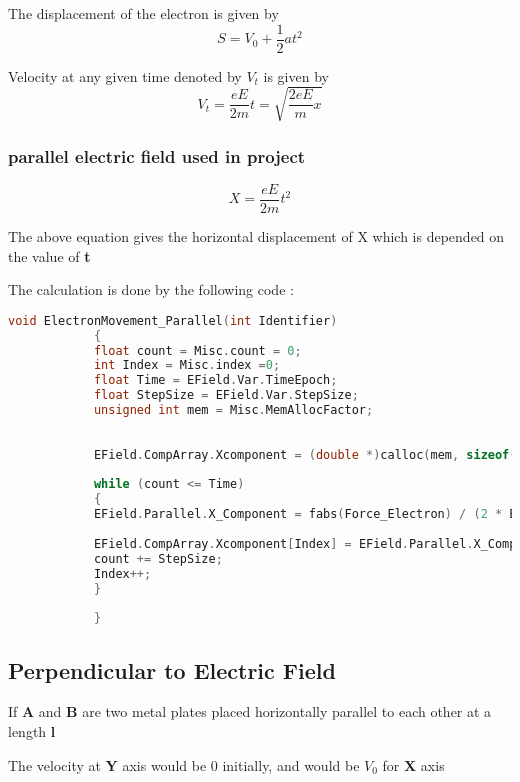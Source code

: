 \documentclass[a4paper,20pt,twoside]{report}
\begin{document}
			The displacement of the electron is given by 
			\begin{equation}
			S = V_0 + \frac{1}{2}at^2
			\end{equation}
			
			Velocity at any given time denoted by \textbf{$V_t$} is given by
			\begin{equation}
			V_t = \frac{eE}{2m}t = \sqrt{\frac{2eE}{m} x}
			\end{equation}
			
			\subsubsection{parallel electric field used in project}
			
			\begin{equation}
			X = \frac{eE}{2m}t^2
			\end{equation}
			
			The above equation gives the horizontal displacement of X which is depended
			on the value of \textbf{t}
			
			The calculation is done by the following code :
			\vspace{10mm}
			\begin{lstlisting}[language = C]
		void ElectronMovement_Parallel(int Identifier)
			{
			float count = Misc.count = 0;
			int Index = Misc.index =0;
			float Time = EField.Var.TimeEpoch;
			float StepSize = EField.Var.StepSize;
			unsigned int mem = Misc.MemAllocFactor;
			
			
			EField.CompArray.Xcomponent = (double *)calloc(mem, sizeof(double));
		
			while (count <= Time)
			{
			EField.Parallel.X_Component = fabs(Force_Electron) / (2 * ELECTRON_MASS) * pow(count, 2);
			
			EField.CompArray.Xcomponent[Index] = EField.Parallel.X_Component;
			count += StepSize;
			Index++;
			}
		
			}
		\end{lstlisting}
	
	\subsection{Perpendicular to Electric Field}
	If \textbf{A} and \textbf{B} are two metal plates placed horizontally parallel to each other
	at a length \textbf{l}
	
	The velocity at \textbf{Y} axis would be 0 initially, and would be $V_0$ for \textbf{X} axis
	
\end{document}
